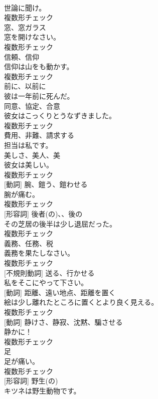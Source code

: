 \documentclass[8pt]{extreport}
\begin{document}
\begin{CJK}{UTF8}{min}
\\	世論に聞け。	
\\	複数形チェック
\\	[名詞]	窓、窓ガラス	
\\	窓を開けなさい。	
\\	複数形チェック
\\	[名詞]	信頼、信仰	
\\	信仰は山をも動かす。	
\\	複数形チェック
\\	[副詞]	前に、以前に	
\\	彼は一年前に死んだ。	
\\	[名詞]	同意、協定、合意	
\\	彼女はこっくりとうなずきました。	
\\	複数形チェック
\\	[動詞]	費用、非難、請求する	
\\	担当は私です。	
\\	[名詞]	美しさ、美人、美	
\\	彼女は美しい。	
\\	複数形チェック
\\	[名詞] [動詞]	腕、鎧う、鎧わせる	
\\	腕が痛む。	
\\	複数形チェック
\\	[名詞] [形容詞]	後者(の)、、後の	
\\	その芝居の後半は少し退屈だった。	
\\	複数形チェック
\\	[名詞]	義務、任務、税	
\\	義務を果たしなさい。	
\\	複数形チェック
\\	[動詞] [不規則動詞]	送る、行かせる	
\\	私をそこにやって下さい。	
\\	[名詞] [動詞]	距離、遠い地点、距離を置く	
\\	絵は少し離れたところに置くとより良く見える。	
\\	複数形チェック
\\	[名詞] [動詞]	静けさ、静寂、沈黙、騙させる	
\\	静かに！	
\\	複数形チェック
\\	[名詞]	足	
\\	足が痛い。	
\\	複数形チェック
\\	[名詞] [形容詞]	野生(の)	
\\	キツネは野生動物です。	

\end{CJK}
\end{document}
